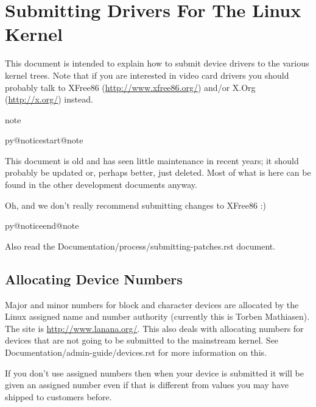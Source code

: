 \documentclass[a4paper,8pt,english]{sphinxmanual}
\makeatletter
\renewenvironment{notice}[2]{%
          \def\py@noticetype{#1}
          \begin{coloredbox}{#1}
          \bf\it
          \par\strong{#2}
          \csname py@noticestart@#1\endcsname
        }
	{
          \csname py@noticeend@\py@noticetype\endcsname
          \end{coloredbox}
        }
\makeatother
\begin{document}
\chapter{Submitting Drivers For The Linux Kernel}
\label{process/submitting-drivers:submittingdrivers}\label{process/submitting-drivers:submitting-drivers-for-the-linux-kernel}\label{process/submitting-drivers::doc}
This document is intended to explain how to submit device drivers to the
various kernel trees. Note that if you are interested in video card drivers
you should probably talk to XFree86 (\href{http://www.xfree86.org/}{http://www.xfree86.org/}) and/or X.Org
(\href{http://x.org/}{http://x.org/}) instead.

\begin{notice}{note}{Note:}
This document is old and has seen little maintenance in recent years; it
should probably be updated or, perhaps better, just deleted.  Most of
what is here can be found in the other development documents anyway.

Oh, and we don't really recommend submitting changes to XFree86 :)
\end{notice}

Also read the Documentation/process/submitting-patches.rst document.


\section{Allocating Device Numbers}
\label{process/submitting-drivers:allocating-device-numbers}
Major and minor numbers for block and character devices are allocated
by the Linux assigned name and number authority (currently this is
Torben Mathiasen). The site is \href{http://www.lanana.org/}{http://www.lanana.org/}. This
also deals with allocating numbers for devices that are not going to
be submitted to the mainstream kernel.
See Documentation/admin-guide/devices.rst for more information on this.

If you don't use assigned numbers then when your device is submitted it will
be given an assigned number even if that is different from values you may
have shipped to customers before.
\end{document}
